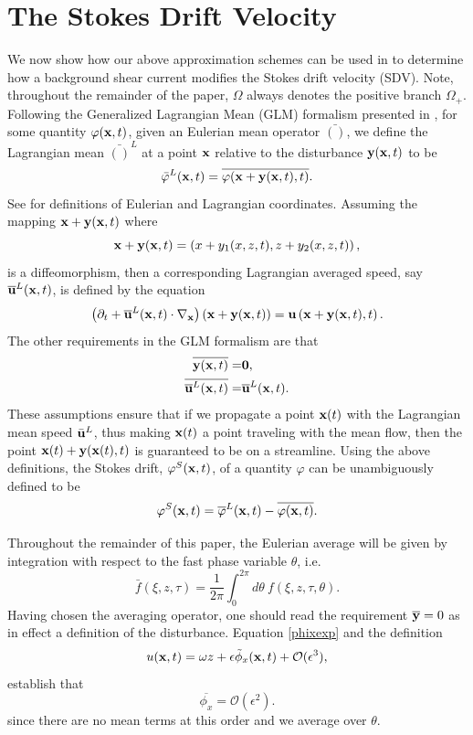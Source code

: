 \documentclass{JFM_Style/jfm}
\newcommand{\pd}{\partial}
\begin{document}
\section{The Stokes Drift Velocity}
We now show how our above approximation schemes can be used in to determine how a background shear current modifies the Stokes drift velocity (SDV).  Note, throughout the remainder of the paper, $\Omega$ always denotes the positive branch $\Omega_{+}$.  Following the Generalized Lagrangian Mean (GLM) formalism presented in \cite{andrews}, for some quantity $\varphi({\bf x},t)$, given an
Eulerian mean operator $\bar{()}$, we define the Lagrangian mean $\bar{()}^{L}$ at a point ${\bf x}$ relative to the disturbance ${\bf y}({\bf x},t)$ to be  
\[
\bar{\varphi}^{L}({\bf x},t) = \overline{\varphi({\bf x}+{\bf y}({\bf x},t),t)}.
\]
See \cite{kundu} for definitions of Eulerian and Lagrangian coordinates.  Assuming the mapping ${\bf x} + {\bf y}({\bf x},t)$ where
\[
{\bf x} + {\bf y}({\bf x},t) = \left(x+y_{1}(x,z,t),z+y_{2}(x,z,t)\right),
\]
is a diffeomorphism, then a corresponding Lagrangian averaged speed, say $\overline{{\bf u}}^{L}({\bf x},t)$, is defined by the equation
\begin{equation}
\left(\pd_{t} + \overline{{\bf u}}^{L}({\bf x},t)\cdot \nabla_{{\bf x}} \right) \left({\bf x} + {\bf y}({\bf x},t)\right) = {\bf u}\left({\bf x} + {\bf y}({\bf x},t),t\right).
\label{speeddef}
\end{equation}
The other requirements in the GLM formalism are that 
\begin{align*}
\overline{{\bf y}({\bf x},t)} = & \bf{0}, \\
\overline{\overline{{\bf u}}^{L}({\bf x},t)} = & \overline{{\bf u}}^{L}({\bf x},t).
\end{align*}
These assumptions ensure that if we propagate a point ${\bf x}(t)$ with the Lagrangian mean speed $\bar{{\bf u}}^{L}$, thus making ${\bf x}(t)$ a point traveling with the mean flow, then the point ${\bf x}(t) + {\bf y}({\bf x}(t),t)$ is guaranteed to be on a streamline.  Using the above definitions, the Stokes drift, $\varphi^{S}({\bf x},t)$, of a quantity $\varphi$ can be unambiguously defined to be 
\[
\varphi^{S}({\bf x},t) = \overline{\varphi}^{L}({\bf x},t) - \overline{\varphi({\bf x},t)}. 
\]

Throughout the remainder of this paper, the Eulerian average will be given by integration with respect to the fast phase variable $\theta$, i.e.  
\[
\bar{f}(\xi,z,\tau) = \frac{1}{2\pi}\int_{0}^{2\pi} d\theta~ f(\xi,z,\tau,\theta).
\]
Having chosen the averaging operator, one should read the requirement $\overline{{\bf y}}=0$ as in effect a definition of the disturbance.  Equation \eqref{phixexp} and the definition
\[
u({\bf x},t) = \omega z + \epsilon \tilde{\phi}_{x}({\bf x},t) + \mathcal{O}(\epsilon^{3}), 
\]
establish that 
\[
\overline{\phi_{x}}= \mathcal{O}(\epsilon^{2}). 
\]
since there are no mean terms at this order and we average over $\theta$.
\end{document}
